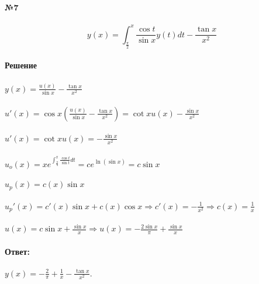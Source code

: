 \documentclass[10pt,a4paper]{article}
\begin{document}
	\noindent\textbf{№7} \\ \\
	$$y(x)=\int_{\frac{\pi}{2}}^x \frac{\cos t}{\sin x} y(t) dt - \frac{\tan x}{x^2}$$ \\
	\textbf{Решение}\\\\
	$y(x)=\frac{u(x)}{\sin x} - \frac{\tan x}{x^2}$\\ \\
	$u'(x)=\cos x (\frac{u(x)}{\sin x} - \frac{\tan x}{x^2})=\cot x u(x) - \frac{\sin x}{x^2}$\\ \\
	$u'(x)=\cot x u(x) = -\frac{\sin x}{x^2}$\\ \\
	$u_{o}(x)=x e^{\int_{\frac{\pi}{4}}^x \frac{\cos t}{\sin t} dt} = c e^{\ln (\sin x)} = c\sin x$\\ \\
	$u_{p}(x)=c(x)\sin x$\\ \\
	$u_{p}'(x) =c'(x) \sin x + c(x) \cos x \Rightarrow c'(x) = -\frac{1}{x^2} \Rightarrow c(x) = \frac{1}{x}$\\ \\
	$u(x)=c\sin x + \frac{\sin x}{x} \Rightarrow u(x)=-\frac{2\sin x}{\pi} + \frac{\sin x}{x}$\\ \\
	\textbf{Ответ:} \\ \\
	$y(x)=-\frac{2}{\pi}+\frac{1}{x}-\frac{\tan x}{x^2}.$\\ \\
\end{document}
